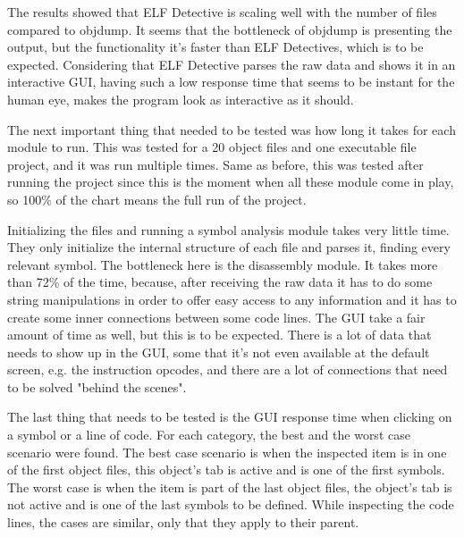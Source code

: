 The results showed that ELF Detective is scaling well with the number of files compared to objdump. It seems that the bottleneck of objdump is presenting the output, but the functionality it’s faster than ELF Detectives, which is to be expected. Considering that ELF Detective parses the raw data and shows it in an interactive GUI, having such a low response time that seems to be instant for the human eye, makes the program look as interactive as it should.

The next important thing that needed to be tested was how long it takes for each module to run. This was tested for a 20 object files and one executable file project, and it was run multiple times. Same as before, this was tested after running the project since this is the moment when all these module come in play, so 100\% of the chart means the full run of the project.


Initializing the files and running a symbol analysis module takes very little time. They only initialize the internal structure of each file and parses it, finding every relevant symbol. The bottleneck here is the disassembly module. It takes more than 72\% of the time, because, after receiving the raw data it has to do some string manipulations in order to offer easy access to any information and it has to create some inner connections between some code lines. The GUI take a fair amount of time as well, but this is to be expected. There is a lot of data that needs to show up in the GUI, some that it’s not even available at the default screen, e.g. the instruction opcodes, and there are a lot of connections that need to be solved "behind the scenes".

The last thing that needs to be tested is the GUI response time when clicking on a symbol or a line of code. For each category, the best and the worst case scenario were found. The best case scenario is when the inspected item is in one of the first object files, this object’s tab is active and is one of the first symbols. The worst case is when the item is part of the last object files, the object’s tab is not active and is one of the last symbols to be defined. While inspecting the code lines, the cases are similar, only that they apply to their parent.



